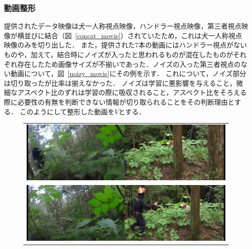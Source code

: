 \begin{enumerate}
\begin{end}
\subsubsection{動画整形}
提供されたデータ映像は犬一人称視点映像，ハンドラー視点映像，第三者視点映像が横並びに結合（図~\ref{concat_movie}）されていたため，これは犬一人称視点映像のみを切り出した．
また，提供された7本の動画にはハンドラー視点がないものや，加えて，結合時にノイズが入ったと思われるものが混在したものがそれぞれ存在したため画像サイズが不揃いであった．ノイズの入った第三者視点のない動画について，図~\ref{noizy_movie}にその例を示す．
これについて，ノイズ部分は切り取ったが比率は揃えなかった．
ノイズは学習に悪影響を与えること，微細なアスペクト比のずれは学習の際に吸収されること，アスペクト比をそろえる際に必要性の有無を判断できない情報が切り取られることをその判断理由とする．
このようにして整形した動画を$V$とする．
\begin{figure}[htbp]
    \begin{tabular}{c}
      \begin{minipage}{0.18\hsize}
        \begin{center}
          \includegraphics[clip, width=12cm]{./Figures/2015_gonta_1.eps}
        \end{center}
      \end{minipage}
\\
      \begin{minipage}{0.18\hsize}
        \begin{center}
          \includegraphics[clip, width=12cm]{./Figures/2015_gonta_2.eps}
        \end{center}
      \end{minipage}

\end{tabular}
\end{figure}
\end{end}
\end{enumerate}
